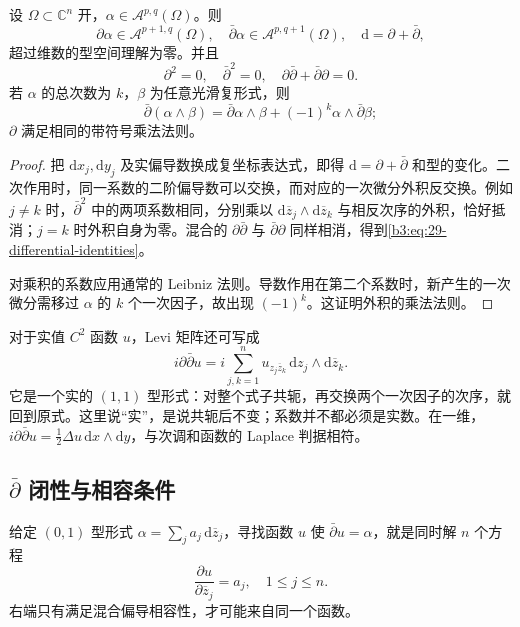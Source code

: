 \begin{proposition}\label{b3:prop:29-differential-splitting}
设 \(\Omega\subset\mathbb C^n\) 开，\(\alpha\in\mathcal A^{p,q}(\Omega)\)。则
\[
 \partial\alpha\in\mathcal A^{p+1,q}(\Omega),\quad
 \bar\partial\alpha\in\mathcal A^{p,q+1}(\Omega),\quad
 \mathrm d=\partial+\bar\partial,
\]
超过维数的型空间理解为零。并且
\begin{equation}\label{b3:eq:29-differential-identities}
 \partial^2=0,\quad \bar\partial^2=0,\quad
 \partial\bar\partial+\bar\partial\partial=0.
\end{equation}
若 \(\alpha\) 的总次数为 \(k\)，\(\beta\) 为任意光滑复形式，则
\[
 \bar\partial(\alpha\wedge\beta)
 =\bar\partial\alpha\wedge\beta+(-1)^k\alpha\wedge\bar\partial\beta;
\]
\(\partial\) 满足相同的带符号乘法法则。
\end{proposition}
\begin{proof}
把 \(\mathrm dx_j,\mathrm dy_j\) 及实偏导数换成复坐标表达式，即得 \(\mathrm d=\partial+\bar\partial\) 和型的变化。二次作用时，同一系数的二阶偏导数可以交换，而对应的一次微分外积反交换。例如 \(j\ne k\) 时，\(\bar\partial^2\) 中的两项系数相同，分别乘以 \(\mathrm d\overline z_j\wedge\mathrm d\overline z_k\) 与相反次序的外积，恰好抵消；\(j=k\) 时外积自身为零。混合的 \(\partial\bar\partial\) 与 \(\bar\partial\partial\) 同样相消，得到\eqref{b3:eq:29-differential-identities}。

对乘积的系数应用通常的 Leibniz 法则。导数作用在第二个系数时，新产生的一次微分需移过 \(\alpha\) 的 \(k\) 个一次因子，故出现 \((-1)^k\)。这证明外积的乘法法则。
\end{proof}

对于实值 \(C^2\) 函数 \(u\)，Levi 矩阵还可写成
\[
 i\partial\bar\partial u
 =i\sum_{j,k=1}^n u_{z_j\overline z_k}\,
   \mathrm dz_j\wedge\mathrm d\overline z_k.
\]
它是一个实的 \((1,1)\) 型形式：对整个式子共轭，再交换两个一次因子的次序，就回到原式。这里说“实”，是说共轭后不变；系数并不都必须是实数。在一维，\(i\partial\bar\partial u=\tfrac12\Delta u\,\mathrm dx\wedge\mathrm dy\)，与次调和函数的 Laplace 判据相符。

\subsection{\texorpdfstring{\(\bar\partial\)}{dbar} 闭性与相容条件}
\label{b3:subsec:290503}

给定 \((0,1)\) 型形式 \(\alpha=\sum_j a_j\,\mathrm d\overline z_j\)，寻找函数 \(u\) 使 \(\bar\partial u=\alpha\)，就是同时解 \(n\) 个方程
\[
 \frac{\partial u}{\partial\overline z_j}=a_j,\quad 1\le j\le n.
\]
右端只有满足混合偏导相容性，才可能来自同一个函数。

